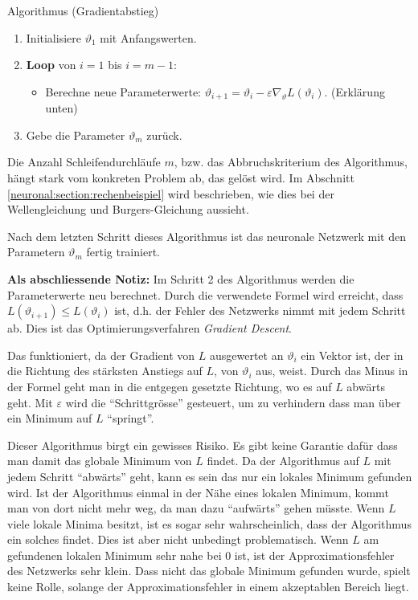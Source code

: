 \begin{aufgabe}
    Algorithmus (Gradientabstieg)
    \begin{enumerate}
        \item Initialisiere \( \vartheta_1 \) mit Anfangswerten.
        \item \textbf{Loop} von \( i = 1 \) bis \( i = m - 1 \):
        \begin{itemize}
            \item Berechne neue Parameterwerte: \( \vartheta_{i+1} = \vartheta_i - \varepsilon \nabla_\vartheta L\left(\vartheta_i\right) \). (Erklärung unten)
        \end{itemize}
        \item Gebe die Parameter \( \vartheta_m \) zurück.
    \end{enumerate}
\end{aufgabe}

Die Anzahl Schleifendurchläufe \( m \), bzw. das Abbruchskriterium des Algorithmus, hängt stark vom konkreten Problem ab, das gelöst wird.
Im Abschnitt \ref{neuronal:section:rechenbeispiel} wird beschrieben, wie dies bei der Wellengleichung und Burgers-Gleichung aussieht.

Nach dem letzten Schritt dieses Algorithmus ist das neuronale Netzwerk mit den Parametern \( \vartheta_m \) fertig trainiert.

\textbf{Als abschliessende Notiz:} Im Schritt 2 des Algorithmus werden die Parameterwerte neu berechnet.
Durch die verwendete Formel wird erreicht, dass \( L(\vartheta_{i+1}) \leq L(\vartheta_i) \) ist, d.h. der Fehler des Netzwerks nimmt mit jedem Schritt ab.
Dies ist das Optimierungsverfahren \emph{Gradient Descent}.

Das funktioniert, da der Gradient von \( L \) ausgewertet an \( \vartheta_i \) ein Vektor ist, der in die Richtung des stärksten Anstiegs auf \( L \), von \(\vartheta_i \) aus, weist.
Durch das Minus in der Formel geht man in die entgegen gesetzte Richtung, wo es auf \( L \) abwärts geht. 
Mit \( \varepsilon \) wird die ``Schrittgrösse'' gesteuert, um zu verhindern dass man über ein Minimum auf \( L \) ``springt''.

Dieser Algorithmus birgt ein gewisses Risiko. 
Es gibt keine Garantie dafür dass man damit das globale Minimum von \( L \) findet.
Da der Algorithmus auf \( L \) mit jedem Schritt ``abwärts'' geht, kann es sein das nur ein lokales Minimum gefunden wird.
Ist der Algorithmus einmal in der Nähe eines lokalen Minimum, kommt man von dort nicht mehr weg, da man dazu ``aufwärts'' gehen müsste.
Wenn \( L \) viele lokale Minima besitzt, ist es sogar sehr wahrscheinlich, dass der Algorithmus ein solches findet.
Dies ist aber nicht unbedingt problematisch.
Wenn \( L \) am gefundenen lokalen Minimum sehr nahe bei 0 ist, ist der Approximationsfehler des Netzwerks sehr klein.
Dass nicht das globale Minimum gefunden wurde, spielt keine Rolle, solange der Approximationsfehler in einem akzeptablen Bereich liegt.

